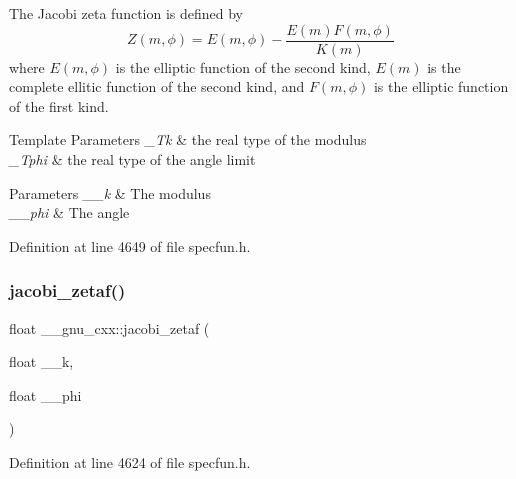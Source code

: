 The Jacobi zeta function is defined by \[ Z(m,\phi) = E(m,\phi) - \frac{E(m)F(m,\phi)}{K(m)} \] where $ E(m,\phi) $ is the elliptic function of the second kind, $ E(m) $ is the complete ellitic function of the second kind, and $ F(m,\phi) $ is the elliptic function of the first kind.


\begin{DoxyTemplParams}{Template Parameters}
{\em \+\_\+\+Tk} & the real type of the modulus \\
\hline
{\em \+\_\+\+Tphi} & the real type of the angle limit \\
\hline
\end{DoxyTemplParams}

\begin{DoxyParams}{Parameters}
{\em \+\_\+\+\_\+k} & The modulus \\
\hline
{\em \+\_\+\+\_\+phi} & The angle \\
\hline
\end{DoxyParams}


Definition at line 4649 of file specfun.\+h.

\mbox{\label{group__gnu__math__spec__func_gaedb6b352331c67b9dea73660e2045668}} 
\subsubsection{\texorpdfstring{jacobi\+\_\+zetaf()}{jacobi\_zetaf()}}
{\footnotesize\ttfamily float \+\_\+\+\_\+gnu\+\_\+cxx\+::jacobi\+\_\+zetaf (\begin{DoxyParamCaption}\item[{float}]{\+\_\+\+\_\+k,  }\item[{float}]{\+\_\+\+\_\+phi }\end{DoxyParamCaption})\hspace{0.3cm}{\ttfamily [inline]}}



Definition at line 4624 of file specfun.\+h.

\mbox{\label{group__gnu__math__spec__func_ga9db158df9459aa12c840724338753913}} 
